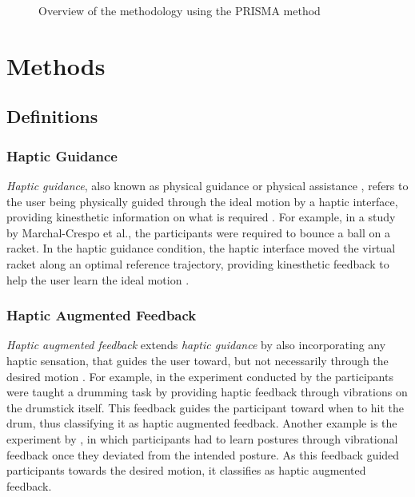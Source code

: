 
\begin{figure*}[htbp]
    \centering
     
    \caption{Overview of the methodology using the PRISMA method}
    \label{fig:prisma}
\end{figure*}

\section{Methods}
\label{sec:methods}

\subsection{Definitions}
\label{sec:definitions}

\subsubsection{Haptic Guidance}
\textit{Haptic guidance}, also known as physical guidance or physical assistance \cite{Sigrist2013AugmentedReview}, refers to the user being physically guided through the ideal motion by a haptic interface, providing kinesthetic information on what is required \cite{Feygin2002HapticSkill}. 
For example, in a study by Marchal-Crespo et al., the participants were required to bounce a ball on a racket. In the haptic guidance condition, the haptic interface moved the virtual racket along an optimal reference trajectory, providing kinesthetic feedback to help the user learn the ideal motion \cite{Crespo2015}.

\subsubsection{Haptic Augmented Feedback}
\textit{Haptic augmented feedback} extends \textit{haptic guidance} by also incorporating any haptic sensation, that guides the user toward, but not necessarily through the desired motion \cite{Sigrist2013AugmentedReview}. 
For example, in the experiment conducted by \cite{Lee2012} the participants were taught a drumming task by providing haptic feedback through vibrations on the drumstick itself. This feedback guides the participant toward when to hit the drum, thus classifying it as haptic augmented feedback. Another example is the experiment by \cite{Hanashima2023}, in which participants had to learn postures through vibrational feedback once they deviated from the intended posture. As this feedback guided participants towards the desired motion, it classifies as haptic augmented feedback.


